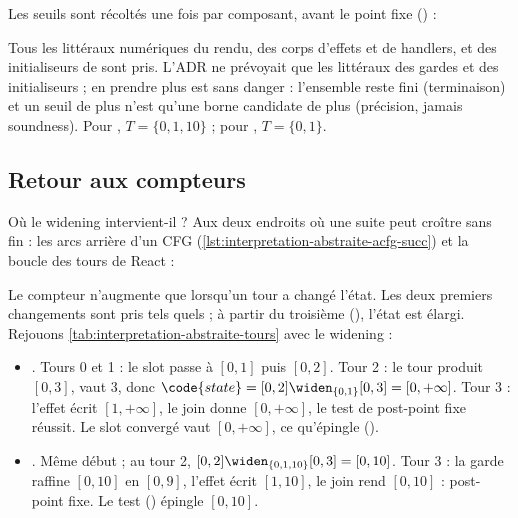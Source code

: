 Les seuils sont récoltés une fois par composant, avant le point fixe
() :


Tous les littéraux numériques du rendu, des corps d'effets et de handlers, et
des initialiseurs de  sont pris. L'ADR ne prévoyait que les
littéraux des gardes et des initialiseurs ; en prendre plus est sans danger :
l'ensemble reste fini (terminaison) et un seuil de plus n'est qu'une borne
candidate de plus (précision, jamais soundness). Pour ,
$T = \{0, 1, 10\}$ ; pour , $T = \{0, 1\}$.

\subsection{Retour aux compteurs}

Où le widening intervient-il ? Aux deux endroits où une suite peut croître
sans fin : les arcs arrière d'un CFG (\cref{lst:interpretation-abstraite-acfg-succ})
et la boucle des tours de React :


Le compteur  n'augmente que lorsqu'un tour a changé l'état. Les
deux premiers changements sont pris tels quels ; à partir du troisième
(), l'état est élargi. Rejouons
\cref{tab:interpretation-abstraite-tours} avec le widening :

\begin{itemize}
  \item {}. Tours 0 et 1 : le slot passe à $[0,1]$ puis $[0,2]$.
    Tour 2 : le tour produit $[0,3]$,  vaut 3, donc
    $\code{state} = [0,2] \widen_{\{0,1\}} [0,3] = [0,+\infty]$. Tour 3 :
    l'effet écrit $[1,+\infty]$, le join donne $[0,+\infty]$, le test de
    post-point fixe réussit. Le slot convergé vaut $[0,+\infty]$, ce
    qu'épingle 
    ().
  \item {}. Même début ; au tour 2,
    $[0,2] \widen_{\{0,1,10\}} [0,3] = [0,10]$. Tour 3 : la garde raffine
    $[0,10]$ en $[0,9]$, l'effet écrit $[1,10]$, le join rend $[0,10]$ : post-point
    fixe. Le test 
    () épingle $[0,10]$.
\end{itemize}

